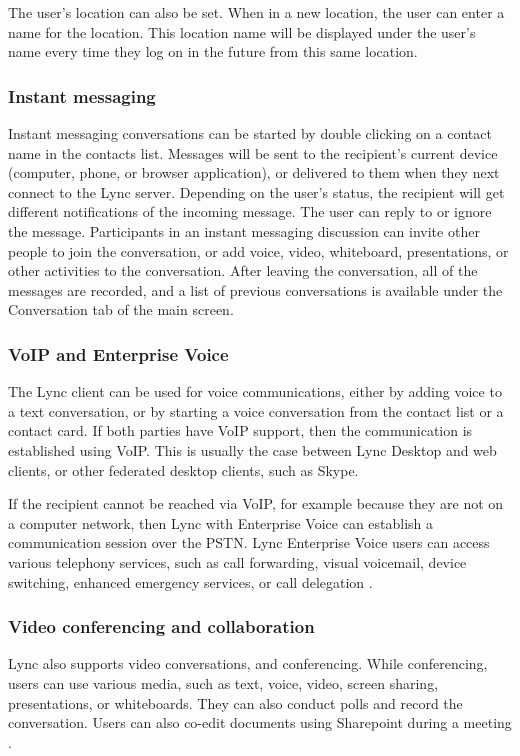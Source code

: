 The user's location can also be set. When in a new location, the user can enter a name for the location. This location name will be displayed under the user's name every time they log on in the future from this same location\cite[Ch. 1.1]{winters_mastering_2012}.


\subsubsection{Instant messaging}
Instant messaging conversations can be started by double clicking on a contact name in the contacts list. Messages will be sent to the recipient's current device (computer, phone, or browser application), or delivered to them when they next connect to the Lync server. Depending on the user's  status, the recipient will get different notifications of the incoming message. The user can reply to or ignore the message. Participants in an instant messaging discussion can invite other people to join the conversation, or add voice, video, whiteboard, presentations, or other activities to the conversation. After leaving the conversation, all of the messages are recorded, and a list of previous conversations is available under the Conversation tab of the main screen.


\subsubsection{VoIP and Enterprise Voice}
The Lync client can be used for voice communications, either by adding voice to a text conversation, or by starting a voice conversation from the contact list or a contact card. If both parties have VoIP support, then the communication is established using VoIP. This is usually the case between Lync Desktop and web clients, or other federated desktop clients, such as Skype.

If the recipient cannot be reached via VoIP, for example because they are not on a computer network, then Lync with Enterprise Voice can establish a communication session over the PSTN.
Lync Enterprise Voice users can access various telephony services, such as call forwarding, visual voicemail, device switching, enhanced emergency services, or call delegation
\cite[Ch. 1.1]{winters_mastering_2012}.

\subsubsection{Video conferencing and collaboration}
Lync also supports video conversations, and conferencing. While conferencing, users can use various media, such as text, voice, video, screen sharing, presentations, or whiteboards. They can also conduct polls and record the conversation. Users can also co-edit documents using Sharepoint during a meeting
\cite[Ch. 1.1]{winters_mastering_2012}.

